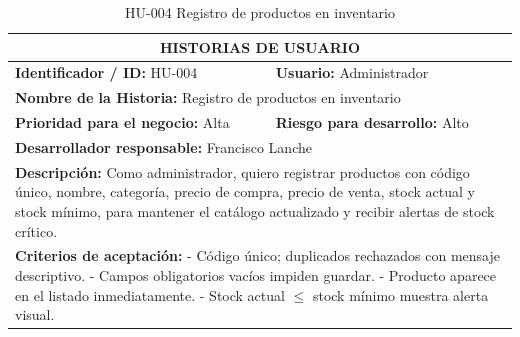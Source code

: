 \documentclass[12pt, letterpaper]{report}
\begin{document}
\begin{table}[H]
\centering
\caption{HU-004 Registro de productos en inventario}
\begin{tabularx}{\textwidth}{|X X|}
\hline
\multicolumn{2}{|c|}{\textbf{HISTORIAS DE USUARIO}} \\ \hline
\textbf{Identificador / ID:} HU-004 & \textbf{Usuario:} Administrador \\ \hline
\multicolumn{2}{|l|}{\textbf{Nombre de la Historia:} Registro de productos en inventario} \\ \hline
\textbf{Prioridad para el negocio:} Alta & \textbf{Riesgo para desarrollo:} Alto \\ \hline
\multicolumn{2}{|l|}{\textbf{Desarrollador responsable:} Francisco Lanche} \\ \hline
\multicolumn{2}{|p{0.95\textwidth}|}{\textbf{Descripción:} Como administrador, quiero registrar productos con código único, nombre, categoría, precio de compra, precio de venta, stock actual y stock mínimo, para mantener el catálogo actualizado y recibir alertas de stock crítico.} \\ \hline
\multicolumn{2}{|p{0.95\textwidth}|}{\textbf{Criterios de aceptación:} \newline
- Código único; duplicados rechazados con mensaje descriptivo. \newline
- Campos obligatorios vacíos impiden guardar. \newline
- Producto aparece en el listado inmediatamente. \newline
- Stock actual $\leq$ stock mínimo muestra alerta visual.} \\ \hline
\end{tabularx}
\end{table}
\end{document}

